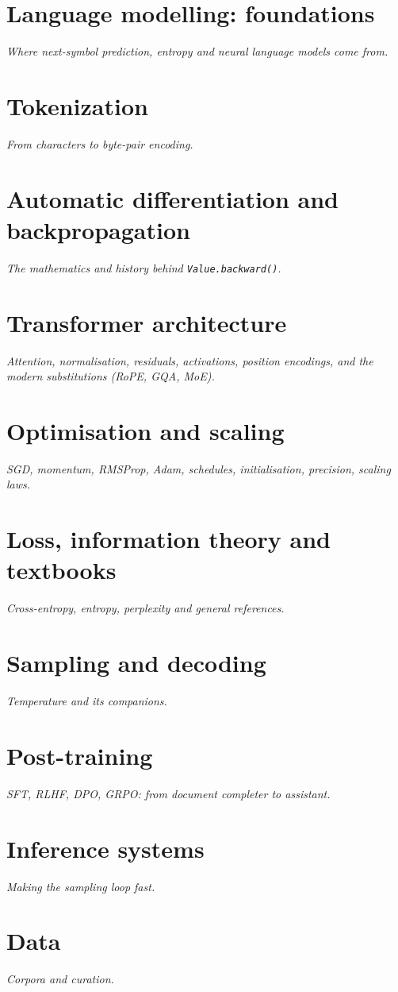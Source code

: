 \documentclass[10pt,letterpaper]{article}
\newcommand{\code}[1]{\lstinline[basicstyle=\ttfamily\small]|#1|}
\begin{document}
\section*{Language modelling: foundations}
\emph{Where next-symbol prediction, entropy and neural language models come from.}
\printbibliography[heading=none,keyword=foundations]

\section*{Tokenization}
\emph{From characters to byte-pair encoding.}
\printbibliography[heading=none,keyword=tokenization]

\section*{Automatic differentiation and backpropagation}
\emph{The mathematics and history behind \code{Value.backward()}.}
\printbibliography[heading=none,keyword=autodiff]

\section*{Transformer architecture}
\emph{Attention, normalisation, residuals, activations, position encodings, and the modern substitutions (RoPE, GQA, MoE).}
\printbibliography[heading=none,keyword=architecture]

\section*{Optimisation and scaling}
\emph{SGD, momentum, RMSProp, Adam, schedules, initialisation, precision, scaling laws.}
\printbibliography[heading=none,keyword=optimisation]

\section*{Loss, information theory and textbooks}
\emph{Cross-entropy, entropy, perplexity and general references.}
\printbibliography[heading=none,keyword=textbooks]

\section*{Sampling and decoding}
\emph{Temperature and its companions.}
\printbibliography[heading=none,keyword=sampling]

\section*{Post-training}
\emph{SFT, RLHF, DPO, GRPO: from document completer to assistant.}
\printbibliography[heading=none,keyword=posttraining]

\section*{Inference systems}
\emph{Making the sampling loop fast.}
\printbibliography[heading=none,keyword=inference]

\section*{Data}
\emph{Corpora and curation.}
\printbibliography[heading=none,keyword=data]
\end{document}
